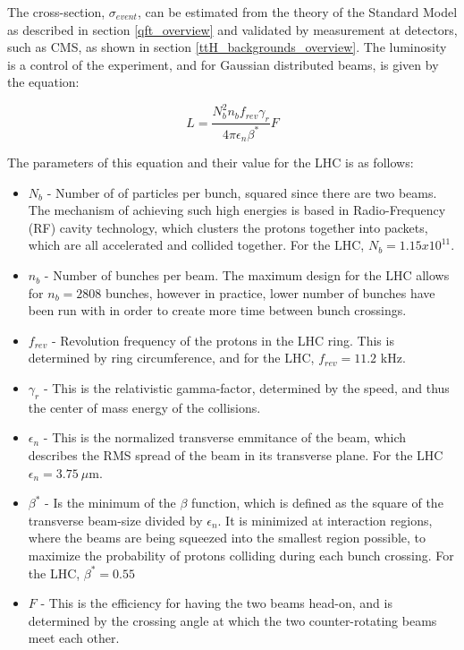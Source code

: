 \noindent  The cross-section, $\sigma_{event}$, can be estimated from the
theory of the Standard Model as described in section
\ref{qft_overview} and validated by measurement at detectors, such as
CMS, as shown in section \ref{ttH_backgrounds_overview}.  The
luminosity is a control of the experiment, and for Gaussian
distributed beams, is given by the equation:

\begin{equation}\label{eq:lumi}
L = \frac{ N_{b}^{2}n_{b}f_{rev}\gamma_{r}
}{ 4\pi\epsilon_{n}\beta^{\ast} }F
\end{equation}

\noindent The parameters of this equation and their value for the LHC
is as follows:
\begin{itemize}
\item $N_{b}$ - Number of of particles per bunch, squared since there
  are two beams.  The mechanism of achieving such high energies is
  based in Radio-Frequency (RF) cavity technology, which clusters the
  protons together into packets, which are all accelerated and
  collided together.  For the LHC, $N_{b} = 1.15 x 10^{11}$.
\item $n_{b}$ - Number of bunches per beam.  The maximum design for
  the LHC allows for $n_{b} = 2808$ bunches, however in practice,
  lower number of bunches have been run with in order to create more
  time between bunch crossings.  
\item $f_{rev}$ - Revolution frequency of the protons in the LHC
  ring.  This is determined by ring circumference, and for the LHC,
  $f_{rev} = 11.2$ kHz. 
\item $\gamma_{r}$ - This is the relativistic gamma-factor, determined
  by the speed, and thus the center of mass energy of the collisions.  
\item $\epsilon_{n}$ - This is the normalized transverse emmitance of
  the beam, which describes the RMS spread of the beam in its
  transverse plane.  For the LHC $\epsilon_{n} = 3.75~\mu$m.  
\item $\beta^{\ast}$ - Is the minimum of the $\beta$ function, which
  is defined as the square of the transverse beam-size divided by
  $\epsilon_{n}$.  It is minimized at interaction regions, where the
  beams are being squeezed into the smallest region possible, to
  maximize the probability of protons colliding during each bunch
  crossing.  For the LHC, $\beta^{\ast} = 0.55$ 
\item $F$ - This is the efficiency for having the two beams head-on,
  and is determined by the crossing angle at which the two
  counter-rotating beams meet each other.  
\end{itemize}

